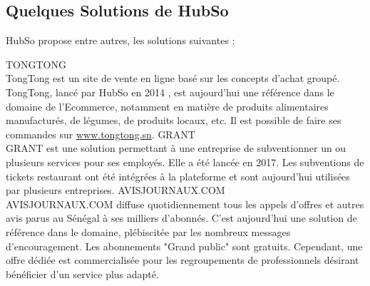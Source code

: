 \subsection{Quelques Solutions de HubSo }
HubSo propose entre autres, les solutions suivantes : 
\begin{itemize}
	\itemcheck TONGTONG \\
	TongTong est un site de vente en ligne basé sur les concepts d'achat groupé. TongTong, lancé par HubSo en 2014 , est aujourd'hui une référence dans le domaine de l'Ecommerce, notamment en matière de produits alimentaires manufacturés, de légumes, de produits locaux, etc. Il est possible de faire ses commandes sur \url{www.tongtong.sn}.
	\itemcheck GRANT \\
	GRANT est une solution permettant à une entreprise de subventionner un ou plusieurs services pour ses employés. Elle a été lancée en 2017. Les subventions de tickets restaurant ont été intégrées à la plateforme et sont aujourd'hui utilisées par plusieurs entreprises.
	\itemcheck AVISJOURNAUX.COM \\
	AVISJOURNAUX.COM diffuse quotidiennement tous les appels d'offres et autres avis parus au Sénégal à ses milliers d'abonnés. C'est aujourd'hui une solution de référence dans le domaine, plébiscitée par les nombreux messages d'encouragement. Les abonnements "Grand public" sont gratuits. Cependant, une offre dédiée est commercialisée pour les regroupements de professionnels désirant bénéficier d'un service plus adapté. 
\end{itemize}

